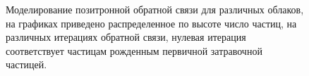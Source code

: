 \begin{figure}[ph!]
    \begin{center}
        \begin{minipage}[h]{0.49\linewidth}
        \end{minipage}
        \hfill
        \begin{minipage}[h]{0.49\linewidth}
        \end{minipage}
        \vfill
        \begin{minipage}[h]{0.49\linewidth}
        \end{minipage}
        \hfill
        \begin{minipage}[h]{0.49\linewidth}
        \end{minipage}
        \vfill
        \begin{minipage}[h]{0.49\linewidth}
        \end{minipage}
        \caption{Моделирование позитронной обратной связи для различных облаков, на графиках приведено распределенное по высоте число частиц, на различных итерациях обратной связи, нулевая итерация соответствует частицам рожденным первичной затравочной частицей.}
    \end{center}
    \label{fig:storm:vertical_gamma}
\end{figure}

